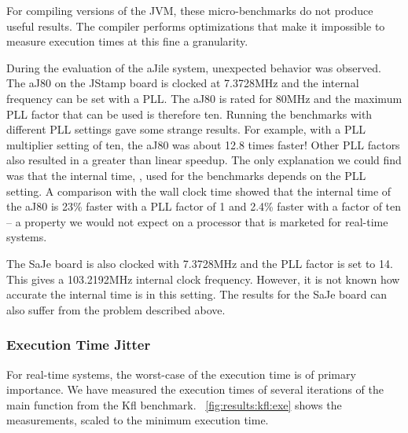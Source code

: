 For compiling versions of the JVM, these micro-benchmarks do not
produce useful results. The compiler performs optimizations that
make it impossible to measure execution times at this fine a
granularity.

During the evaluation of the aJile system, unexpected behavior was
observed. The aJ80 on the JStamp board is clocked at 7.3728MHz and
the internal frequency can be set with a PLL. The aJ80 is rated for
80MHz and the maximum PLL factor that can be used is therefore ten.
Running the benchmarks with different PLL settings gave some strange
results. For example, with a PLL multiplier setting of ten, the aJ80
was about 12.8 times faster! Other PLL factors also resulted in a
greater than linear speedup. The only explanation we could find was
that the internal time, , used for
the benchmarks depends on the PLL setting. A comparison with the
wall clock time showed that the internal time of the aJ80 is 23\%
faster with a PLL factor of 1 and 2.4\% faster with a factor of ten
-- a property we would not expect on a processor that is marketed
for real-time systems.

The SaJe board is also clocked with 7.3728MHz and the PLL factor is
set to 14. This gives a 103.2192MHz internal clock frequency.
However, it is not known how accurate the internal time is in this
setting. The results for the SaJe board can also suffer from the
problem described above.


\subsubsection{Execution Time Jitter}

For real-time systems, the worst-case of the execution time is of
primary importance. We have measured the execution times of several
iterations of the main function from the Kfl benchmark.
\figurename~\ref{fig:results:kfl:exe} shows the measurements, scaled
to the minimum execution time.

